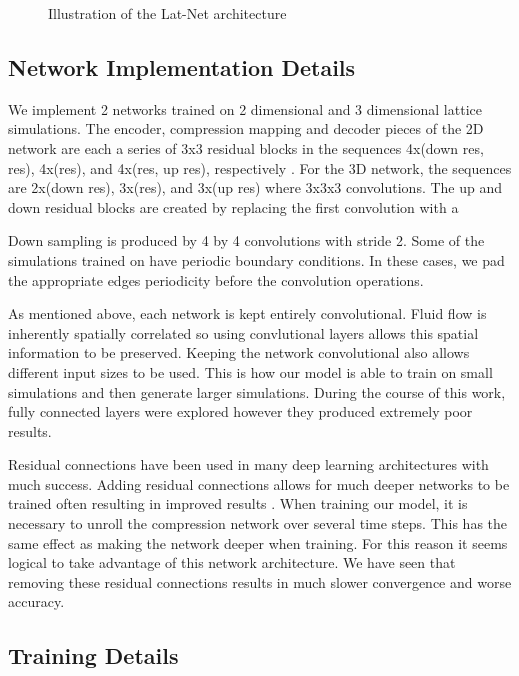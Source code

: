 \documentclass{article}
\begin{document}
\begin{figure}[!t]
\centering
{}
\caption{Illustration of the Lat-Net architecture}
\label{fig_1}
\end{figure}

\subsection{Network Implementation Details}

We implement 2 networks trained on 2 dimensional and 3 dimensional lattice simulations. The encoder, compression mapping and decoder pieces of the 2D network are each a series of 3x3 residual blocks in the sequences 4x(down res, res), 4x(res), and 4x(res, up res), respectively \cite{he2016deep}. For the 3D network, the sequences are 2x(down res), 3x(res), and 3x(up res) where 3x3x3 convolutions. The up and down residual blocks are created by replacing the first convolution with a 

Down sampling is produced by 4 by 4 convolutions with stride 2. Some of the simulations trained on have periodic boundary conditions. In these cases, we pad the appropriate edges periodicity before the convolution operations.

As mentioned above, each network is kept entirely convolutional. Fluid flow is inherently spatially correlated so using convlutional layers allows this spatial information to be preserved. Keeping the network convolutional also allows different input sizes to be used. This is how our model is able to train on small simulations and then generate larger simulations. During the course of this work, fully connected layers were explored however they produced extremely poor results.

Residual connections have been used in many deep learning architectures with much success. Adding residual connections allows for much deeper networks to be trained often resulting in improved results \cite{he2016deep}. When training our model, it is necessary to unroll the compression network over several time steps. This has the same effect as making the network deeper when training. For this reason it seems logical to take advantage of this network architecture. We have seen that removing these residual connections results in much slower convergence and worse accuracy.



\subsection{Training Details}
\end{document}
